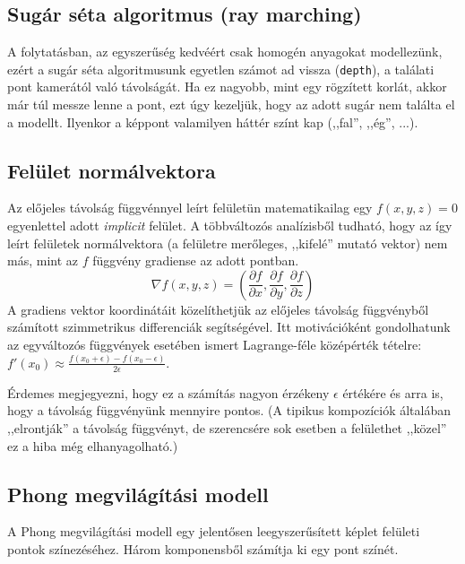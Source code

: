 \subsection{Sugár séta algoritmus (ray marching)}

A folytatásban, az egyszerűség kedvéért csak homogén anyagokat modellezünk, ezért a sugár séta
algoritmusunk egyetlen számot ad vissza (\texttt{depth}), a találati pont kamerától való távolságát.
Ha ez nagyobb, mint egy rögzített korlát, akkor már túl messze lenne a pont, ezt úgy kezeljük,
hogy az adott sugár nem találta el a modellt. Ilyenkor a képpont valamilyen háttér színt kap (,,fal'', ,,ég'', ...).


\subsection{Felület normálvektora}

Az előjeles távolság függvénnyel leírt felületün matematikailag egy $f(x, y, z)=0$ egyenlettel
adott \emph{implicit} felület. A többváltozós analízisből tudható, hogy az így leírt felületek
normálvektora (a felületre merőleges, ,,kifelé'' mutató vektor) nem más, mint az $f$ függvény
gradiense az adott pontban.
$$
\nabla f(x, y, z) =
\left(
  \frac{\partial f}{\partial x}, 
  \frac{\partial f}{\partial y}, 
  \frac{\partial f}{\partial z} 
\right)
$$
A gradiens vektor koordinátáit közelíthetjük az előjeles távolság függvényből számított
szimmetrikus differenciák segítségével. Itt motivációként gondolhatunk az egyváltozós függvények esetében
ismert Lagrange-féle középérték tételre: 
$f'(x_0)\approx \frac{f(x_0+\epsilon) - f(x_0-\epsilon)}{2\epsilon}$.


Érdemes megjegyezni, hogy ez a számítás nagyon érzékeny $\epsilon$ értékére és arra is, hogy a
távolság függvényünk mennyire pontos. (A tipikus kompozíciók általában ,,elrontják'' a távolság függvényt, 
de szerencsére sok esetben a felülethet ,,közel'' ez a hiba még elhanyagolható.)

\subsection{Phong megvilágítási modell}

A Phong megvilágítási modell egy jelentősen leegyszerűsített képlet felületi pontok
színezéséhez. Három komponensből számítja ki egy pont színét.

